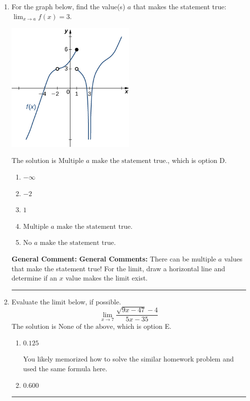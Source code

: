 \documentclass{extbook}[14pt]
\newcommand{\litem}[1]{\item #1

\rule{\textwidth}{0.4pt}}
\begin{document}
\begin{enumerate}\litem{
For the graph below, find the value(s) $a$ that makes the statement true: $ \displaystyle \lim_{x \rightarrow a} f(x) = 3$.

\begin{center}
    \includegraphics[width=0.5\textwidth]{../Figures/evaluateLimitGraphicallyA.png}
\end{center}


The solution is \( \text{Multiple } a \text{ make the statement true}. \), which is option D.\begin{enumerate}[label=\Alph*.]
\item \( -\infty \)


\item \( -2 \)


\item \( 1 \)


\item \( \text{Multiple } a \text{ make the statement true}. \)


\item \( \text{No } a \text{ make the statement true}. \)


\end{enumerate}

\textbf{General Comment:} \textbf{General Comments:} There can be multiple $a$ values that make the statement true! For the limit, draw a horizontal line and determine if an $x$ value makes the limit exist.
}
\litem{
Evaluate the limit below, if possible.
\[ \lim_{x \rightarrow 7} \frac{\sqrt{9x - 47} - 4}{5x - 35} \]The solution is \( \text{None of the above} \), which is option E.\begin{enumerate}[label=\Alph*.]
\item \( 0.125 \)

You likely memorized how to solve the similar homework problem and used the same formula here.
\item \( 0.600 \)


\end{enumerate}}
\end{enumerate}
\end{document}
